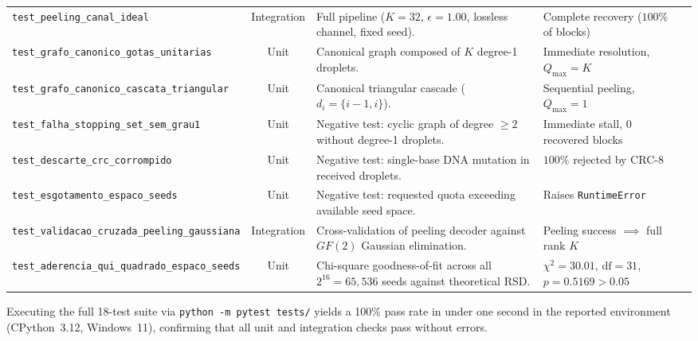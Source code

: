 \begin{table}[htbp]
{\begin{tabular}{lclp{5.6cm}p{4.2cm}}
        \texttt{test\_peeling\_canal\_ideal} & Integration & Full pipeline ($K=32$, $\epsilon = 1.00$, lossless channel, fixed seed). & Complete recovery ($100\%$ of blocks) \\
        \texttt{test\_grafo\_canonico\_gotas\_}\allowbreak\texttt{unitarias} & Unit & Canonical graph composed of $K$ degree-1 droplets. & Immediate resolution, $Q_{\max} = K$ \\
        \texttt{test\_grafo\_canonico\_cascata\_}\allowbreak\texttt{triangular} & Unit & Canonical triangular cascade ($d_i = \{i-1, i\}$). & Sequential peeling, $Q_{\max} = 1$ \\
        \texttt{test\_falha\_stopping\_set\_}\allowbreak\texttt{sem\_grau1} & Unit & Negative test: cyclic graph of degree $\ge 2$ without degree-1 droplets. & Immediate stall, $0$ recovered blocks \\
        \texttt{test\_descarte\_crc\_corrompido} & Unit & Negative test: single-base DNA mutation in received droplets. & $100\%$ rejected by CRC-8 \\
        \texttt{test\_esgotamento\_espaco\_seeds} & Unit & Negative test: requested quota exceeding available seed space. & Raises \texttt{RuntimeError} \\
        \texttt{test\_validacao\_cruzada\_peeling\_}\allowbreak\texttt{gaussiana} & Integration & Cross-validation of peeling decoder against $GF(2)$ Gaussian elimination. & Peeling success $\implies$ full rank $K$ \\
        \texttt{test\_aderencia\_qui\_quadrado\_}\allowbreak\texttt{espaco\_seeds} & Unit & Chi-square goodness-of-fit across all $2^{16} = 65{,}536$ seeds against theoretical RSD. & $\chi^2 = 30.01$, $\text{df} = 31$, $p = 0.5169 > 0.05$ \\
        \bottomrule
    \end{tabular}%
    }
\end{table}

Executing the full 18-test suite via \texttt{python -m pytest tests/} yields a 100\% pass rate in under one second in the reported environment (CPython~3.12, Windows~11), confirming that all unit and integration checks pass without errors.
